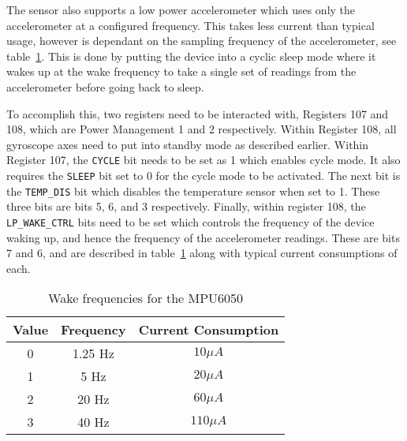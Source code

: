 The sensor also supports a low power accelerometer which uses only the accelerometer at a configured frequency. This takes less current than typical usage, however is dependant on the sampling frequency of the accelerometer, see table~\ref{tab:sensor:wake}. This is done by putting the device into a cyclic sleep mode where it wakes up at the wake frequency to take a single set of readings from the accelerometer before going back to sleep. 

To accomplish this, two registers need to be interacted with, Registers 107 and 108, which are Power Management 1 and 2 respectively. Within Register 108, all gyroscope axes need to put into standby mode as described earlier. Within Register 107, the \verb|CYCLE| bit needs to be set as 1 which enables cycle mode. It also requires the \verb|SLEEP| bit set to 0 for the cycle mode to be activated. The next bit is the \verb|TEMP_DIS| bit which disables the temperature sensor when set to 1. These three bits are bits 5, 6, and 3 respectively. Finally, within register 108, the \verb|LP_WAKE_CTRL| bits need to be set which controls the frequency of the device waking up, and hence the frequency of the accelerometer readings. These are bits 7 and 6, and are described in table~\ref{tab:sensor:wake} along with typical current consumptions of each. 

\begin{table}
	\centering
	\begin{tabular}{|c|c|c|}
		\hline
		Value & Frequency & Current Consumption \\
		\hline
		0 & 1.25 Hz & $10\mu A$ \\
		1 & 5 Hz & $20\mu A$ \\
		2 & 20 Hz & $60\mu A$ \\
		3 & 40 Hz & $110\mu A$ \\
		\hline
	\end{tabular}
	\caption{Wake frequencies for the MPU6050}
	\label{tab:sensor:wake}
\end{table}
